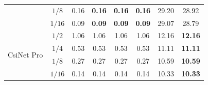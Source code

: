 \begin{table}[htb]
\begin{tabular}{|cc|cccc|cc|}
\multicolumn{1}{|c|}{}                            & $1/8$  & \multicolumn{1}{c|}{0.16}          & \multicolumn{1}{c|}{\textbf{0.16}} & \multicolumn{1}{c|}{\textbf{0.16}} & \textbf{0.16} & \multicolumn{1}{c|}{29.20}         & 28.92          \\ \cline{2-8} 
\multicolumn{1}{|c|}{}                            & $1/16$ & \multicolumn{1}{c|}{0.09}          & \multicolumn{1}{c|}{\textbf{0.09}} & \multicolumn{1}{c|}{\textbf{0.09}} & \textbf{0.09} & \multicolumn{1}{c|}{29.07}         & 28.79          \\ \hline
\multicolumn{1}{|c|}{\multirow{4}{*}{CsiNet Pro}} & $1/2$  & \multicolumn{1}{c|}{1.06}          & \multicolumn{1}{c|}{1.06}          & \multicolumn{1}{c|}{1.06}          & 1.06          & \multicolumn{1}{c|}{12.16}         & \textbf{12.16} \\ \cline{2-8} 
\multicolumn{1}{|c|}{}                            & $1/4$  & \multicolumn{1}{c|}{0.53}          & \multicolumn{1}{c|}{0.53}          & \multicolumn{1}{c|}{0.53}          & 0.53          & \multicolumn{1}{c|}{11.11}         & \textbf{11.11} \\ \cline{2-8} 
\multicolumn{1}{|c|}{}                            & $1/8$  & \multicolumn{1}{c|}{0.27}          & \multicolumn{1}{c|}{0.27}          & \multicolumn{1}{c|}{0.27}          & 0.27          & \multicolumn{1}{c|}{10.59}         & \textbf{10.59} \\ \cline{2-8} 
\multicolumn{1}{|c|}{}                            & $1/16$ & \multicolumn{1}{c|}{0.14}          & \multicolumn{1}{c|}{0.14}          & \multicolumn{1}{c|}{0.14}          & 0.14          & \multicolumn{1}{c|}{10.33}         & \textbf{10.33} \\ \hline
\end{tabular}
\end{table}

